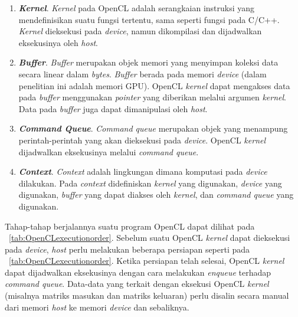 \begin{enumerate}
	\item \textbf{\textit{Kernel}}. \textit{Kernel} pada OpenCL adalah serangkaian instruksi yang mendefinisikan suatu fungsi tertentu, sama seperti fungsi pada C/C++. \textit{Kernel} dieksekusi pada \textit{device}, namun dikompilasi dan dijadwalkan eksekusinya oleh \textit{host}.
	
	\item \textbf{\textit{Buffer}}. \textit{Buffer} merupakan objek memori yang menyimpan koleksi data secara linear dalam \textit{bytes}. \textit{Buffer} berada pada memori \textit{device} (dalam penelitian ini adalah memori GPU). OpenCL \textit{kernel} dapat mengakses data pada \textit{buffer} menggunakan \textit{pointer} yang diberikan melalui argumen \textit{kernel}. Data pada \textit{buffer} juga dapat dimanipulasi oleh \textit{host}.
	
	\item \textbf{\textit{Command Queue}}. \textit{Command queue} merupakan objek yang menampung perintah-perintah yang akan dieksekusi pada \textit{device}. OpenCL \textit{kernel} dijadwalkan eksekusinya melalui \textit{command queue}.
	
	\item \textbf{\textit{Context}}. \textit{Context} adalah lingkungan dimana komputasi pada \textit{device} dilakukan. Pada \textit{context} didefiniskan \textit{kernel} yang digunakan, \textit{device} yang digunakan, \textit{buffer} yang dapat diakses oleh \textit{kernel}, dan \textit{command queue} yang digunakan.
	
\end{enumerate}

Tahap-tahap berjalannya suatu program OpenCL dapat dilihat pada \tab~\ref{tab:OpenCLexecutionorder}. Sebelum suatu OpenCL \textit{kernel} dapat dieksekusi pada \textit{device}, \textit{host} perlu melakukan beberapa persiapan seperti pada \tab~\ref{tab:OpenCLexecutionorder}. Ketika persiapan telah selesai, OpenCL \textit{kernel} dapat dijadwalkan eksekusinya dengan cara melakukan \textit{enqueue} terhadap \textit{command queue}. Data-data yang terkait dengan eksekusi OpenCL \textit{kernel} (misalnya matriks masukan dan matriks keluaran) perlu disalin secara manual dari memori \textit{host} ke memori \textit{device} dan sebaliknya.

